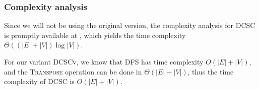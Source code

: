 \subsubsection{Complexity analysis}
Since we will not be using the original version, the complexity analysis for \textsc{DCSC} is promptly available at \cite{fleischer-dcsc}, which yields the time complexity $\Theta((|E|+|V|) \log |V|)$.\par
For our variant \textsc{DCSCv}, we know that \textsc{DFS} has time complexity $O(|E|+|V|)$, and the \textsc{Transpose} operation can be done in $\Theta(|E|+|V|)$, thus the time complexity of \textsc{DCSC} is $O(|E|+|V|)$.
